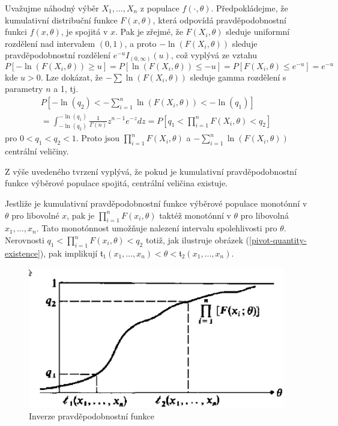\begin{corollary}
Uvažujme náhodný výběr $X_1, ..., X_n$ z populace $f(\cdot, \theta)$. Předpokládejme, že kumulativní distribuční funkce $F(x, \theta)$, která odpovídá pravděpodobnostní funkci $f(x, \theta)$, je spojitá v $x$. Pak je zřejmé, že $F(X_i, \theta)$ sleduje uniformní rozdělení nad intervalem $(0, 1)$, a proto $-\ln \left(F(X_i, \theta) \right)$ sleduje pravděpodobnostní rozdělení $e^{-u}I_{(0, \infty)}(u)$, což vyplývá ze vztahu
\begin{equation*}
P[-\ln \left(F(X_i, \theta) \right) \ge u] = P[\ln \left(F(X_i, \theta)\right) \le -u] = P[F(X_i, \theta) \le e^{-u}] = e^{-u}
\end{equation*}
kde $u > 0$. Lze dokázat, že $-\sum \ln \left(F(X_i, \theta)\right)$ sleduje gamma rozdělení s parametry $n$ a 1, tj.
\begin{gather*}
P \left[-\ln(q_2) < - \sum_{i = 1}^n \ln \left(F(X_i, \theta)\right) < -\ln(q_1)\right]\\
= \int_{-\ln(q_2)}^{-\ln(q_1)}\frac{1}{\Gamma(n)}z^{n - 1}e^{-z}dz = P \left[q_1 < \prod_{i = 1}^n F(X_i, \theta) < q_2 \right]
\end{gather*}
pro $0 < q_1 < q_2 < 1$. Proto jsou $\prod_{i = 1}^n F(X_i, \theta)$ a $-\sum_{i = 1}^n \ln \left(F(X_i, \theta)\right)$ centrální veličiny.
\end{corollary}

Z výše uvedeného tvrzení vyplývá, že pokud je kumulativní pravděpodobnostní funkce výběrové populace spojitá, centrální veličina existuje.

\begin{corollary}
Jestliže je kumulativní pravděpodobnostní funkce výběrové populace monotónní v $\theta$ pro libovolné $x$, pak je $\prod_{i = 1}^n F(x_i, \theta)$ taktéž monotónní v $\theta$ pro libovolná $x_1, ..., x_n$. Tato monotónnost umožňuje nalezení intervalu spolehlivosti pro $\theta$. Nerovnosti $q_1 < \prod_{i = 1}^n F(x_i, \theta) < q_2$ totiž, jak ilustruje obrázek (\ref{pivot-quantity-existence}), pak implikují $\mathfrak{t}_1(x_1, ..., x_n) < \theta < \mathfrak{t}_2(x_1, ..., x_n)$. 
\end{corollary}

\begin{figure}[htp]
\centering
\includegraphics[scale = 0.5]{pictures/pivot_quantity_existence.eps}
\caption{Inverze pravděpodobnostní funkce}
\label{conf-interval-mu-sigma_a}
\end{figure}

